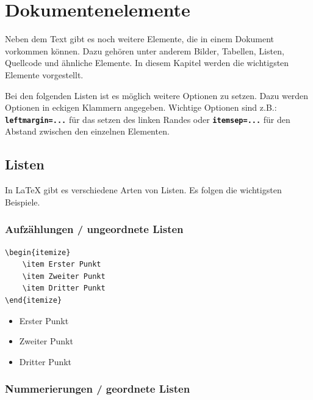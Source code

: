\section{Dokumentenelemente}

Neben dem Text gibt es noch weitere Elemente, die in einem Dokument vorkommen können. Dazu gehören unter anderem Bilder, Tabellen, Listen, Quellcode und ähnliche Elemente. In diesem Kapitel werden die wichtigsten Elemente vorgestellt.

Bei den folgenden Listen ist es möglich weitere Optionen zu setzen. Dazu werden Optionen in eckigen Klammern angegeben.
Wichtige Optionen sind z.B.: \textbf{\texttt{leftmargin=...}} für das setzen des linken Randes oder \textbf{\texttt{itemsep=...}} für den Abstand zwischen den einzelnen Elementen.

\newpage

\subsection{Listen}
In \LaTeX{} gibt es verschiedene Arten von Listen. Es folgen die wichtigsten Beispiele.

\subsubsection{Aufzählungen / ungeordnete Listen}

\begin{minipage}{0.58\textwidth}
    \begin{lstlisting}[language={[LaTeX]TeX}]
\begin{itemize}
    \item Erster Punkt
    \item Zweiter Punkt
    \item Dritter Punkt
\end{itemize}
\end{lstlisting}
\end{minipage}
\hfill
\begin{minipage}{0.35\textwidth}
    \begin{itemize}
        \item Erster Punkt
        \item Zweiter Punkt
        \item Dritter Punkt
    \end{itemize}
\end{minipage}

\subsubsection{Nummerierungen / geordnete Listen}

